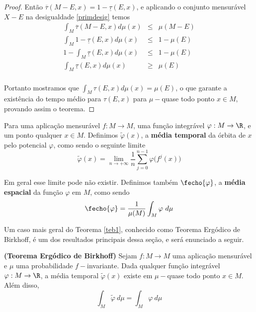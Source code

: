 \begin{proof}
Então $\overline{\tau}(M-E,x)=1-\underline{\tau}(E,x)$, e aplicando o conjunto mensurável $X-E$ na desigualdade \eqref{primdesig} temos
\begin{eqnarray*}
\int_{M}\overline{\tau}(M-E,x)d\mu(x) & \leq & \mu(M-E)\\
\int_{M}1-\underline{\tau}(E,x)d\mu(x) & \leq & 1-\mu(E)\\
1-\int_{M}\underline{\tau}(E,x)d\mu(x) & \leq & 1-\mu(E)\\
\int_{M}\underline{\tau}(E,x)d\mu(x) & \geq & \mu(E)\\
\end{eqnarray*}

Portanto mostramos que $\int_{M}\tau(E,x)d\mu(x)=\mu(E)$, o que garante a existência do tempo médio para $\tau(E,x)$ para $\mu-$quase todo ponto $x\in M$, provando assim o teorema.
\end{proof}

Para uma aplicação mensurável $f:M\to M$, uma função integrável $\varphi:M\to \R$, e um ponto qualquer $x\in M$. Definimos $\tilde{\varphi}(x)$, a \textbf{média temporal} da órbita de $x$ pelo potencial $\varphi$, como sendo o seguinte limite
\begin{equation*}
\tilde{\varphi}(x) = \lim_{n\to+\infty}\dfrac{1}{n}\sum_{j=0}^{n-1}{\varphi\big(f^j(x)\big)}
\end{equation*}

Em geral esse limite pode não existir. Definimos também $\fecho{\varphi}$, a \textbf{média espacial} da função $\varphi$ em $M$, como sendo 
\begin{equation*}
\fecho{\varphi}=\dfrac{1}{\mu(M)}\int_{M}\varphi\ d\mu
\end{equation*}

Um caso mais geral do Teorema \ref{teb1}, conhecido como Teorema Ergódico de Birkhoff, é um dos resultados principais dessa seção, e será enunciado a seguir.

\begin{teorema}\label{teb} {\bf (Teorema Ergódico de Birkhoff)} Sejam $f : M \to M$ uma aplicação mensurável e $\mu$ uma probabilidade $f-$invariante. Dada qualquer função integrável $\varphi : M \to \R$, a média temporal 
 $\tilde{\varphi}(x)$ existe em $\mu-$quase todo ponto $x\in M$. Além disso,
\begin{equation*}
\int_{M}{\tilde{\varphi}\ d\mu}=\int_{M}{\varphi\ d\mu}
\end{equation*}
\end{teorema}

